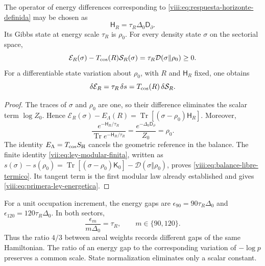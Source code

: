 \begin{theorem}
\label{viii:thm:hamiltoniano-respuesta-termica}
The operator of energy differences corresponding to
\eqref{viii:eq:respuesta-horizonte-definida} may be chosen as
\begin{equation}
 \mathsf H_R=\tau_R\Delta_0\mathsf D_\partial.
 \label{viii:eq:hamiltoniano-respuesta}
\end{equation}
Its Gibbs state at energy scale \(\tau_R\) is \(\rho_0\).
For every density state \(\sigma\) on the sectorial space,
\begin{equation}
 \mathcal E_R(\sigma)-T_{\rm cos}(R)\mathcal S_R(\sigma)
 =\tau_R\mathcal D(\sigma\Vert\rho_0)\geq0.
 \label{viii:eq:balance-libre-termico}
\end{equation}
For a differentiable state variation about \(\rho_0\), with
\(R\) and \(\mathsf H_R\) fixed, one obtains
\begin{equation}
 \delta\mathcal E_R
 =\tau_R\,\delta s
 =T_{\rm cos}(R)\,\delta\mathcal S_R.
 \label{viii:eq:primera-ley-energetica}
\end{equation}
\end{theorem}
\begin{proof}
The traces of \(\sigma\) and \(\rho_0\) are one, so their
difference eliminates the scalar term \(\log Z_0\). Hence
\(\mathcal E_R(\sigma)-E_\Lambda(R)
=\operatorname{Tr}[(\sigma-\rho_0)\mathsf H_R]\).
Moreover,
\[
 \frac{e^{-\mathsf H_R/\tau_R}}
 {\operatorname{Tr}e^{-\mathsf H_R/\tau_R}}
 =\frac{e^{-\Delta_0\mathsf D_\partial}}{Z_0}=\rho_0.
\]
The identity \(E_\Lambda=T_{\rm cos}S_{\rm H}\) cancels the
geometric reference in the balance. The finite identity
\eqref{vii:eq:ley-modular-finita}, written as
\(s(\sigma)-s(\rho_0)
=\operatorname{Tr}[(\sigma-\rho_0)\mathsf K_0]
-\mathcal D(\sigma\Vert\rho_0)\), proves
\eqref{viii:eq:balance-libre-termico}. Its tangent term is the first
modular law already established and gives
\eqref{viii:eq:primera-ley-energetica}.
\end{proof}

For a unit occupation increment, the energy gaps are
\(\epsilon_{90}=90\tau_R\Delta_0\) and
\(\epsilon_{120}=120\tau_R\Delta_0\). In both sectors,
\begin{equation}
 \frac{\epsilon_m}{m\Delta_0}=\tau_R,
 \qquad m\in\{90,120\}.
 \label{viii:eq:pendiente-termica-comun}
\end{equation}
Thus the ratio \(4/3\) between areal weights records different gaps
of the same Hamiltonian. The ratio of an energy gap to the corresponding
variation of \(-\log p\) preserves a common scale. State normalization
eliminates only a scalar constant.


